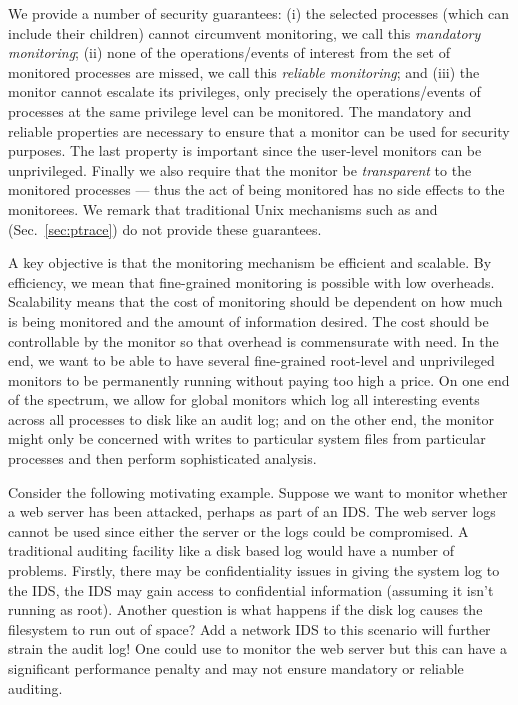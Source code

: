 We provide a number of security guarantees:
(i) the selected processes (which can include their children)
cannot circumvent monitoring, we call this {\em mandatory monitoring};
(ii) none of the operations/events of interest from the set of monitored
processes are missed, we call this {\em reliable monitoring};
and 
(iii) the monitor cannot escalate its privileges, only precisely
the operations/events of processes at the same privilege level can
be monitored.
The mandatory and reliable properties are necessary to ensure that a monitor
can be used for security purposes.
The last property is important since the user-level monitors can be 
unprivileged.
Finally we also require that the monitor be {\em transparent} to the monitored
processes --- thus the act of being monitored has no side effects to the
monitorees.
We remark that traditional Unix mechanisms such as  and 
 (Sec.~\ref{sec:ptrace}) do not provide these guarantees.

A key objective is that the monitoring mechanism be efficient and scalable.
By efficiency, we mean that fine-grained monitoring is possible with low
overheads.
Scalability means that the cost of monitoring should be dependent on
how much is being monitored and the amount of information desired.
The cost should be controllable by the monitor so that overhead is
commensurate with need.
In the end, we want to be able to have several fine-grained root-level and 
unprivileged monitors to be permanently running without 
paying too high a price. 
On one end of the spectrum, we allow for global monitors which
log all interesting events across all processes to disk like 
an audit log; and on the other end, the monitor might only be concerned
with writes to particular system files from particular processes
and then perform sophisticated analysis.

Consider the following motivating example.
Suppose we want to monitor whether a web server has been attacked,
perhaps as part of an IDS.
The web server logs cannot be used since either
the server or the logs could be compromised. 
A traditional auditing facility like a disk based log would 
have a number of problems. Firstly, there may be confidentiality
issues in giving the system log to the IDS, the IDS may gain access to
confidential information (assuming it isn't running as root).
Another question is what happens if the disk log 
causes the filesystem to run out of space?
Add a network IDS to this scenario will further strain the audit log!
One could use  to monitor the web server 
but this can have a significant performance penalty and may
not ensure mandatory or reliable auditing.

